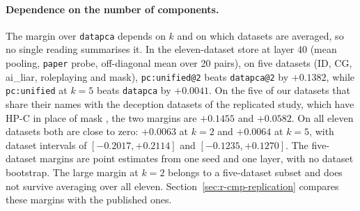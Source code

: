 \paragraph{Dependence on the number of components.}
The margin over \texttt{datapca} depends on $k$ and on which datasets are averaged, so no single reading summarises it.
In the eleven-dataset store at layer 40 (mean pooling, \texttt{paper} probe, off-diagonal mean over 20 pairs), on five datasets (ID, CG, ai\_liar, roleplaying and mask), \texttt{pc:unified@2} beats \texttt{datapca@2} by $+0.1382$, while \texttt{pc:unified} at $k=5$ beats \texttt{datapca} by $+0.0041$. %
On the five of our datasets that share their names with the deception datasets of the replicated study, which have HP-C in place of mask \parencite[p.~4]{mahadik2026persona}, the two margins are $+0.1455$ and $+0.0582$. %
On all eleven datasets both are close to zero: $+0.0063$ at $k=2$ and $+0.0064$ at $k=5$, with dataset intervals of $[-0.2017, +0.2114]$ and $[-0.1235, +0.1270]$. %
The five-dataset margins are point estimates from one seed and one layer, with no dataset bootstrap. %
The large margin at $k=2$ belongs to a five-dataset subset and does not survive averaging over all eleven. %
Section~\ref{sec:r-cmp-replication} compares these margins with the published ones.

